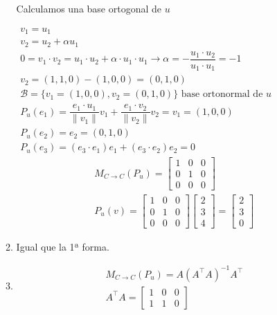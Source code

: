\begin{enumerate}[label=\color{red}\textbf{\arabic*)}]
\begin{enumerate}[label=\underline{\arabic*ª forma:}]
    Calculamos una base ortogonal de $u$

     $\begin{array}{l}
         v_1=u_1\\
         v_2=u_2+\alpha u_1\\
         0=v_1\cdot v_2=u_1\cdot u_2+\alpha\cdot u_1\cdot u_1\longrightarrow \alpha=-\dfrac{u_1\cdot u_2}{u_1\cdot u_1}=-1\\
         v_2=(1,1,0)-(1,0,0)=(0,1,0)\\
         \mathcal{B}=\{v_1=(1,0,0),v_2=(0,1,0)\} \text{ base ortonormal de $u$ }\\
        P_u(e_1)=\dfrac{e_1\cdot u_1}{\|v_1\|}v_1+\dfrac{e_1\cdot v_2}{\|v_2\|}v_2=v_1=(1,0,0)\\
        P_u(e_2)=e_2=(0,1,0)\\
        P_u(e_3)=(e_3\cdot e_1)e_1+(e_3\cdot e_2)e_2=0
     \end{array}$
     \[
     \begin{array}{c}
         M_{C\to C}(P_u)=\begin{bmatrix} 
             1 & 0 & 0\\
             0 & 1 & 0\\
             0 & 0 & 0
         \end{bmatrix}\\
         P_u(v)=\begin{bmatrix} 
             1 & 0 & 0\\
             0 & 1 & 0\\
             0 & 0 & 0
         \end{bmatrix}\begin{bmatrix} 
             2 \\ 3 \\ 4 
         \end{bmatrix}  =\begin{bmatrix} 
         2\\3\\0 
         \end{bmatrix} 
     \end{array}
     \] 
 \item Igual que la 1ª forma.
 \item \[
 \begin{array}{c}
         M_{C\to C}(P_u)=A(A^\intercal A)^{-1}A^\intercal\\
         A^\intercal A=\begin{bmatrix} 
             1 & 0 & 0\\
             1 & 1 & 0

\end{bmatrix}
\end{array}\]
\end{enumerate}
\end{enumerate}
